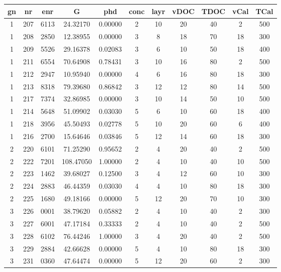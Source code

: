 \begin{table}[h]
	\centering
	\label{tab:emma_all}
	\begin{tabular}{ccccccccccc}
        \hline\hline
        gn  &nr	    &enr	&G	&phd	&conc	    &layr	&vDOC	&TDOC	&vCal	&TCal\\
        \hline
        1   &207	&6113	&24.32170	&0.00000	&2	&10	&20	&40	&2	&500\\
        1   &208	&2850	&12.38955	&0.00000	&3	&8	&18	&70	&18	&300\\
        1   &209	&5526	&29.16378	&0.02083	&3	&6	&10	&50	&18	&400\\
        1   &211	&6554	&70.64908	&0.78431	&3	&10	&16	&80	&2	&500\\
        1   &212	&2947	&10.95940	&0.00000	&4	&6	&16	&80	&18	&300\\
        1   &213	&8318	&79.39680	&0.86842	&3	&12	&12	&80	&14	&500\\
        1   &217	&7374	&32.86985	&0.00000	&3	&10	&14	&50	&10	&500\\
        1   &214	&5648	&51.09902	&0.03030	&5	&6	&10	&60	&18	&400\\
        1   &218	&3956	&45.50493	&0.02778	&5	&10	&20	&60	&6	&400\\
        1   &216	&2700	&15.64646	&0.03846	&5	&12	&14	&60	&18	&300\\

        2   &220	&6101	&71.25290	&0.95652	&2	&4	&20	&40	&2	&500\\
        2   &222	&7201	&108.47050	&1.00000	&2	&4	&10	&40	&10	&500\\
        2   &223	&1462	&39.68027	&0.12500	&3	&4	&12	&60	&10	&300\\
        2   &224	&2883	&46.44359	&0.03030	&4	&4	&10	&80	&18	&300\\
        2   &225	&1680	&49.18166	&0.00000	&5	&12	&20	&70	&10	&300\\

        3   &226	&0001	&38.79620	&0.05882	&2	&4	&10	&40	&2	&300\\
        3   &227	&6001	&47.17184	&0.33333	&2	&4	&10	&40	&2	&500\\
        3   &228	&6102	&76.44246	&1.00000	&3	&4	&20	&40	&2	&500\\
        3   &229	&2884	&42.66628	&0.00000	&5	&4	&10	&80	&18	&300\\
        3   &231	&0360	&47.64474	&0.00000	&5	&12	&20	&60	&2	&300\\


\end{tabular}
\end{table}
